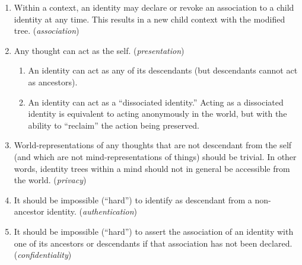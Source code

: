 \documentclass[pra,twocolumn,groupedaddress,10pt]{revtex4}
\theoremstyle{definition}
\begin{document}
\begin{enumerate}

\item Within a context, an identity may declare or revoke an association to a child identity at any time. This results in a new child context with the modified tree. (\emph{association})

\item Any thought can act as the self. (\emph{presentation})
	\begin{enumerate}
		\item An identity can act as any of its descendants (but descendants cannot act as ancestors).
		\item An identity can act as a ``dissociated identity.'' Acting as a dissociated identity is equivalent to acting anonymously in the world, but with the ability to ``reclaim'' the action being preserved.
	\end{enumerate}

\item World-representations of any thoughts that are not descendant from the self (and which are not mind-representations of things) should be trivial. In other words, identity trees within a mind should not in general be accessible from the world. (\emph{privacy})

\item It should be impossible (``hard'') to identify as descendant from a non-ancestor identity. (\emph{authentication})

\item It should be impossible (``hard'') to assert the association of an identity with one of its ancestors or descendants if that association has not been declared. (\emph{confidentiality})

\end{enumerate}
\end{document}
